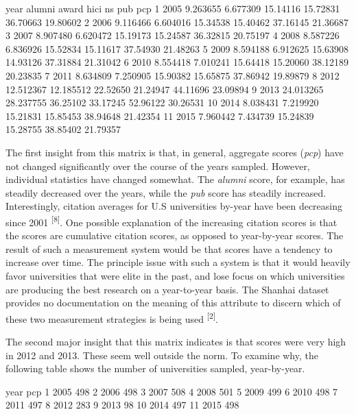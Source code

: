 \documentclass[12pt]{article}
\begin{document}
\begin{Schunk}
\begin{Soutput}
   year    alumni     award     hici       ns      pub      pcp
1  2005  9.263655  6.677309 15.14116 15.72831 36.70663 19.80602
2  2006  9.116466  6.604016 15.34538 15.40462 37.16145 21.36687
3  2007  8.907480  6.620472 15.19173 15.24587 36.32815 20.75197
4  2008  8.587226  6.836926 15.52834 15.11617 37.54930 21.48263
5  2009  8.594188  6.912625 15.63908 14.93126 37.31884 21.31042
6  2010  8.554418  7.010241 15.64418 15.20060 38.12189 20.23835
7  2011  8.634809  7.250905 15.90382 15.65875 37.86942 19.89879
8  2012 12.512367 12.185512 22.52650 21.24947 44.11696 23.09894
9  2013 24.013265 28.237755 36.25102 33.17245 52.96122 30.26531
10 2014  8.038431  7.219920 15.21831 15.85453 38.94648 21.42354
11 2015  7.960442  7.434739 15.24839 15.28755 38.85402 21.79357
\end{Soutput}
\end{Schunk}

The first insight from this matrix is that, in general, aggregate scores (\textit{pcp}) have not changed significantly over the course of the years sampled. However, individual statistics have changed somewhat. The \textit{alumni} score, for example, has steadily decreased over the years, while the \textit{pub} score has steadily increased. Interestingly, citation averages for U.S universities by-year have been decreasing since 2001 \textsuperscript{[8]}. One possible explanation of the increasing citation scores is that the scores are cumulative citation scores, as opposed to year-by-year scores. The result of such a measurement system would be that scores have a tendency to increase over time. The principle issue with such a system is that it would heavily favor universities that were elite in the past, and lose focus on which universities are producing the best research on a year-to-year basis. The Shanhai dataset provides no documentation on the meaning of this attribute to discern which of these two measurement strategies is being used \textsuperscript{[2]}.

The second major insight that this matrix indicates is that scores were very high in 2012 and 2013. These seem well outside the norm. To examine why, the following table shows the number of universities sampled, year-by-year.

\begin{Schunk}
\begin{Soutput}
   year pcp
1  2005 498
2  2006 498
3  2007 508
4  2008 501
5  2009 499
6  2010 498
7  2011 497
8  2012 283
9  2013  98
10 2014 497
11 2015 498
\end{Soutput}
\end{Schunk}
\end{document}
